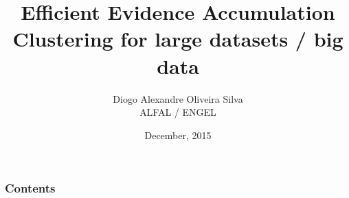 \documentclass{beamer}					%
\title[Thesis presentation]{Efficient Evidence Accumulation Clustering for large datasets / big data}
\author[Silva]{Diogo Alexandre Oliveira Silva \\ \tiny ALFAL / ENGEL}
\institute[AFA/IST]{
Academia da For\c{c}a A\'erea / Instituto Superior T\'ecnico \\
}
\date{December, 2015}
\begin{document}
\begin{frame}[plain]






\titlepage

\end{frame}


\begin{frame}
\frametitle{Contents} %
\footnotesize \tableofcontents %
\end{frame}
\end{document}
